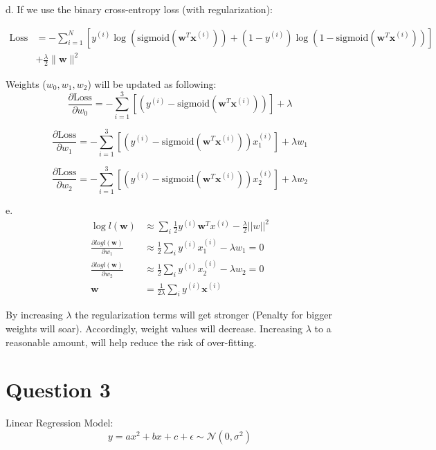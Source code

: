 \documentclass{article}
\begin{document}
\bigskip
\hrulefill
\bigskip

d. If we use the binary cross-entropy loss (with regularization):

\[
\begin{aligned}
\text{Loss} &= -\sum_{i=1}^N \left[ y^{(i)} \log(\text{sigmoid}(\mathbf{w}^T \mathbf{x}^{(i)})) + (1 - y^{(i)}) \log(1 - \text{sigmoid}(\mathbf{w}^T \mathbf{x}^{(i)})) \right] \\ &+ \frac{\lambda}{2} \|\mathbf{w}\|^2
\end{aligned}
\]

Weights ($w_0, w_1, w_2$) will be updated as following:
\[
\frac{\partial \text{Loss}}{\partial w_0} = -\sum_{i=1}^3 \left[ (y^{(i)} - \text{sigmoid}(\mathbf{w}^T \mathbf{x}^{(i)})) \right] + \lambda
\]


\[
\frac{\partial \text{Loss}}{\partial w_1} = -\sum_{i=1}^3 \left[ (y^{(i)} - \text{sigmoid}(\mathbf{w}^T \mathbf{x}^{(i)}))x_1^{(i)} \right] + \lambda w_1
\]

\[
\frac{\partial \text{Loss}}{\partial w_2} = -\sum_{i=1}^3 \left[ (y^{(i)} - \text{sigmoid}(\mathbf{w}^T \mathbf{x}^{(i)}))x_2^{(i)} \right] + \lambda w_2
\]

\bigskip
\hrulefill
\bigskip

e.
\[
\begin{aligned}
\log l(\textbf{w}) &\approx \sum_{i}^{} \frac{1}{2} y^{(i)} \textbf{w}^Tx^{(i)} - \frac{\lambda}{2} ||w||^2 \\
\frac{\partial log l(\textbf{w})}{\partial w_1} &\approx \frac{1}{2} \sum_{i}^{} y^{(i)}x_1^{(i)} - \lambda w_1 = 0 \\
\frac{\partial log l(\textbf{w})}{\partial w_2} &\approx \frac{1}{2} \sum_{i}^{} y^{(i)}x_2^{(i)} - \lambda w_2 = 0 \\
\textbf{w} &= \frac{1}{2\lambda} \sum_{i}^{} y^{(i)} \textbf{x}^{(i)}
\end{aligned}
\]

By increasing $\lambda$ the regularization terms will get stronger (Penalty for bigger weights will soar). Accordingly, weight values will decrease. Increasing $\lambda$ to a reasonable amount, will help reduce the risk of over-fitting.

\pagebreak

\section{Question 3}

Linear Regression Model:
\[
y = ax^2 + bx + c + \epsilon \sim \mathcal{N}(0, \sigma^2)
\]
\end{document}
